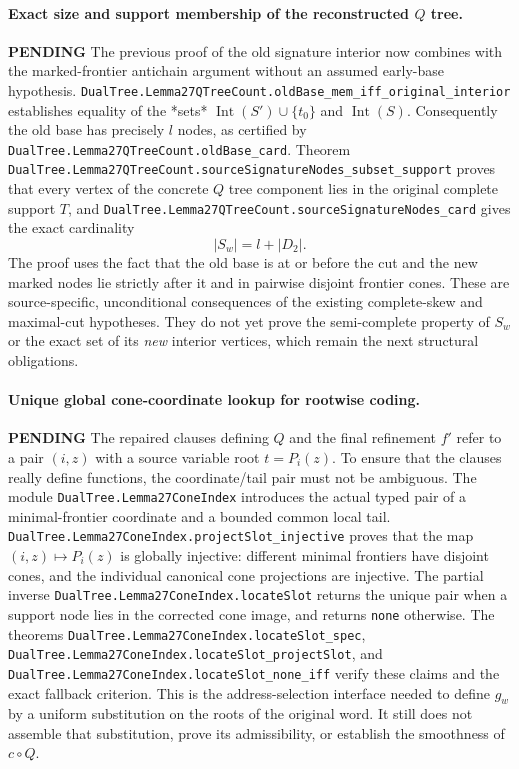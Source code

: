 \documentclass[11pt]{article}
\newcommand{\todo}{\textcolor{gray!70!black}{\textbf{PENDING}}}
\newcommand{\lean}[1]{\texttt{#1}}
\begin{document}
\paragraph{Exact size and support membership of the reconstructed $Q$ tree.} \todo
The previous proof of the old signature interior now combines with
the marked-frontier antichain argument without an assumed
early-base hypothesis.
\lean{DualTree.Lemma27QTreeCount.oldBase_mem_iff_original_interior}
establishes equality of the *sets*
$\operatorname{Int}(S')\cup\{t_0\}$ and $\operatorname{Int}(S)$.
Consequently the old base has precisely $l$ nodes, as certified by
\lean{DualTree.Lemma27QTreeCount.oldBase_card}.
Theorem
\lean{DualTree.Lemma27QTreeCount.sourceSignatureNodes_subset_support}
proves that every vertex of the concrete $Q$ tree component lies in
the original complete support $T$, and
\lean{DualTree.Lemma27QTreeCount.sourceSignatureNodes_card}
gives the exact cardinality
\[
 |S_w|=l+|D_2|.
\]
The proof uses the fact that the old base is at or before the cut
and the new marked nodes lie strictly after it and in pairwise
disjoint frontier cones.  These are source-specific, unconditional
consequences of the existing complete-skew and maximal-cut
hypotheses.  They do not yet prove the semi-complete property of
$S_w$ or the exact set of its \emph{new} interior vertices, which
remain the next structural obligations.



\paragraph{Unique global cone-coordinate lookup for rootwise coding.} \todo
The repaired clauses defining $Q$ and the final refinement $f'$
refer to a pair $(i,z)$ with a source variable root
$t=P_i(z)$.  To ensure that the clauses really define
functions, the coordinate/tail pair must not be ambiguous.
The module \lean{DualTree.Lemma27ConeIndex} introduces the
actual typed pair of a minimal-frontier coordinate and a
bounded common local tail.
\lean{DualTree.Lemma27ConeIndex.projectSlot_injective}
proves that the map $(i,z)\mapsto P_i(z)$ is globally injective:
different minimal frontiers have disjoint cones, and the
individual canonical cone projections are injective.
The partial inverse
\lean{DualTree.Lemma27ConeIndex.locateSlot}
returns the unique pair when a support node lies in the
corrected cone image, and returns \texttt{none} otherwise.
The theorems
\lean{DualTree.Lemma27ConeIndex.locateSlot_spec},
\lean{DualTree.Lemma27ConeIndex.locateSlot_projectSlot}, and
\lean{DualTree.Lemma27ConeIndex.locateSlot_none_iff}
verify these claims and the exact fallback criterion.
This is the address-selection interface needed to define
$g_w$ by a uniform substitution on the roots of the original
word.  It still does not assemble that substitution, prove
its admissibility, or establish the smoothness of $c\circ Q$.
\end{document}
